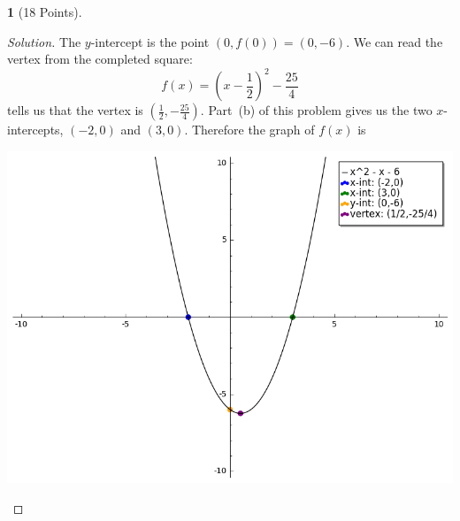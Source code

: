 \documentclass[12pt]{amsart}
\theoremstyle{definition}
\newtheorem{thm}{}
\theoremstyle{definition}
\begin{document}
\begin{thm}[18 Points]
\begin{enumerate}[(a)]
\begin{proof}[Solution]
      The $y$-intercept is the point $(0, f(0)) = (0,-6)$.
      We can read the vertex from the completed square:
      $$f(x) = \left(x - \frac{1}{2}\right)^2 - \frac{25}{4}$$
      tells us that the vertex is $\left(\frac{1}{2},-\frac{25}{4}\right)$.
      Part~(b) of this problem gives us the two $x$-intercepts, $(-2,0)$ and $(3,0)$.
      Therefore the graph of $f(x)$ is 
      \begin{center}
        \includegraphics[scale=0.5]{imgs/Parabola.png}
      \end{center}
    \end{proof}
  \end{enumerate}
\end{thm}
\end{document}
